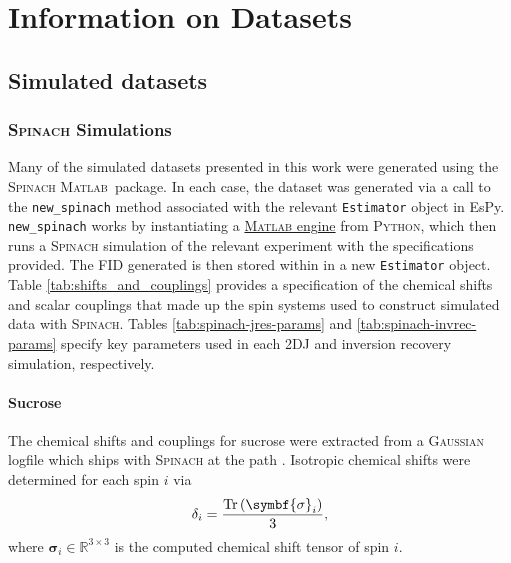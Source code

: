 \chapter{Information on Datasets}
\label{chap:datasets}

\section{Simulated datasets}
\label{sec:simulated-datasets}

\subsection{\textsc{\textsc{Spinach}} Simulations}
Many of the simulated datasets presented in this work were generated using the
\textsc{Spinach} \textsc{Matlab}\textregistered\ package\cite{Hogben2011}.
In each case, the dataset was generated via a call to the \texttt{new\_spinach}
method associated with the relevant \texttt{Estimator} object in \ac{EsPy}.
\texttt{new\_spinach} works by instantiating a \href{https://www.mathworks.com/help/matlab/matlab-engine-for-python.html}{\textsc{Matlab}
engine} from \textsc{Python}, which then runs a \textsc{\textsc{Spinach}} simulation of the relevant
experiment with the specifications provided. The \ac{FID} generated is then
stored within in a new \texttt{Estimator} object.
Table \ref{tab:shifts_and_couplings} provides a specification of the chemical
shifts and scalar couplings that made up the spin systems used to construct
simulated data with \textsc{Spinach}. Tables \ref{tab:spinach-jres-params} and
\ref{tab:spinach-invrec-params} specify key parameters used in each
\ac{2DJ} and inversion recovery simulation, respectively.

\subsubsection{Sucrose}
The chemical shifts and couplings for sucrose were extracted from a
\textsc{Gaussian}\cite{Gaussian03} logfile which ships with \textsc{Spinach} at
the path .
Isotropic chemical shifts were determined for each spin $i$ via
\begin{equation}
    \delta_i = \frac{\Tr \left( \symbf{\sigma}_i \right)}{3},
\end{equation}
where $\symbf{\sigma}_i \in \mathbb{R}^{3 \times 3}$ is the computed chemical
shift tensor of spin $i$.


